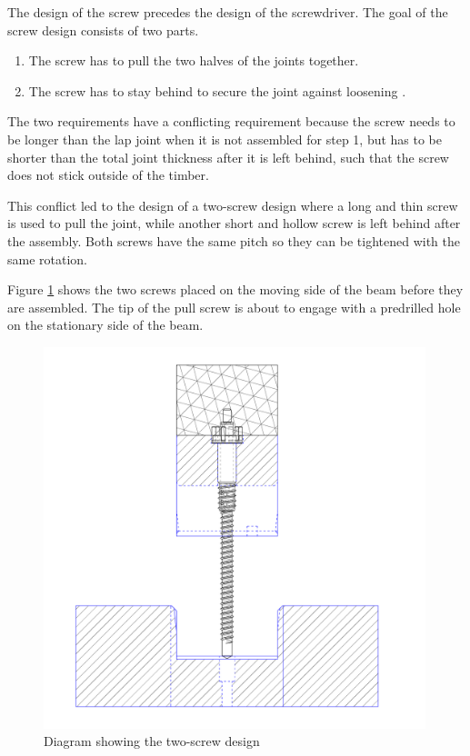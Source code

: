 The design of the screw precedes the design of the screwdriver. The goal of the screw design consists of two parts. 

\begin{enumerate}
    \item The screw has to pull the two halves of the joints together.
    \item The screw has to stay behind to secure the joint against loosening .

\end{enumerate}
The two requirements have a conflicting requirement because the screw needs to be longer than the lap joint when it is not assembled for step 1, but has to be shorter than the total joint thickness after it is left behind, such that the screw does not stick outside of the timber. 

This conflict led to the design of a two-screw design where a long and thin screw is used to pull the joint, while another short and hollow screw is left behind after the assembly. Both screws have the same pitch so they can be tightened with the same rotation.

Figure \ref{fig:two-screw-design} shows the two screws placed on the moving side of the beam before they are assembled. The tip of the pull screw is about to engage with a predrilled hole on the stationary side of the beam.

\begin{figure}[!h]
    \centering
    \includegraphics[width=0.99\textwidth]{images/7a/img25.png}
    \caption{Diagram showing the two-screw design}
    \label{fig:two-screw-design}
\end{figure}

